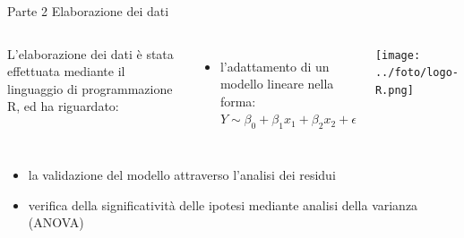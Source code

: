 \documentclass[xcolor={usenames, table, x11names}, final, 10pt]{beamer}
\begin{document}
\begin{frame}{Parte 2 \small{Elaborazione dei dati}}
  \begin{minipage}[0.2\textheight]{\textwidth}
    \begin{columns}[T]
      L'elaborazione dei dati è stata effettuata mediante il linguaggio di
      programmazione R, ed ha riguardato:
      \begin{itemize}
        \item l'adattamento di un modello lineare nella forma:
        \vspace{0.25cm}
        $Y \sim \beta_0 + \beta_1x_1 + \beta_2x_2 + \epsilon$

      \end{itemize}
      \texttt{[image: ../foto/logo-R.png]}
    \end{columns}
  \end{minipage}

  \begin{itemize}
    \item la validazione del modello attraverso l'analisi
    dei residui 
    \item verifica della significatività delle
    ipotesi mediante analisi della varianza (ANOVA)
  \end{itemize}
\end{frame}


%   

\begin{frame}
\end{frame}
\end{document}
